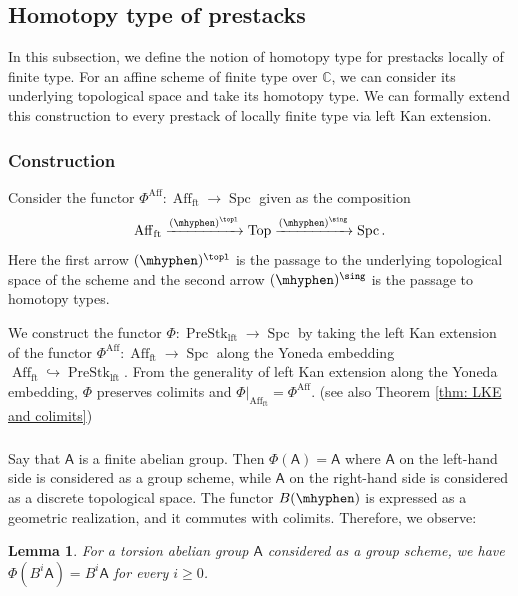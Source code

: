 \documentclass[10pt]{amsart}
\newcommand{\sssec}{\subsubsection}
\newtheorem{lemma}[subsubsection]{Lemma}
\theoremstyle{remark}
\newcommand{\C}{\mathbb{C}}
\newcommand{\on}{\operatorname}
\newcommand{\PreStklft}{\on{PreStk}_{\on{lft}}}
\newcommand{\Aff}{\on{Aff}}
\newcommand{\Affft}{\on{Aff}_{\on{ft}}}
\newcommand{\Spc}{\on{Spc}}
\newcommand{\sfA}{\mathsf{A}}
\begin{document}
\subsection{Homotopy type of prestacks}
In this subsection, we define the notion of homotopy type for prestacks locally of finite type. For an affine scheme of finite type over $\C$, we can consider its underlying topological space and take its homotopy type. We can formally extend this construction to every prestack of locally finite type via left Kan extension.

\sssec{Construction}
Consider the functor $\Phi^{\on{Aff}}: \Affft\rightarrow \Spc$ given as the composition \[\Affft \xrightarrow{(\mhyphen)^{\topl}} \on{Top} \xrightarrow{(\mhyphen)^{\sing}} \Spc.\] Here the first arrow $(\mhyphen)^{\topl}$ is the passage to the underlying topological space of the scheme and the second arrow $(\mhyphen)^{\sing}$ is the passage to homotopy types.
\medskip

We construct the functor $\Phi: \PreStklft \rightarrow \Spc$ by taking the left Kan extension of the functor $\Phi^{\on{Aff}}: \Affft\rightarrow \Spc$ along the Yoneda embedding $\Affft\hookrightarrow\PreStklft$. From the generality of left Kan extension along the Yoneda embedding, $\Phi$ preserves colimits and $\Phi|_{\Affft}=\Phi^{\Aff}$. (see also Theorem \ref{thm: LKE and colimits})

\sssec{}
Say that $\sfA$ is a finite abelian group. Then $\Phi(\sfA)=\sfA$ where $\sfA$ on the left-hand side is considered as a group scheme, while $\sfA$ on the right-hand side is considered as a discrete topological space. The functor $B(\mhyphen)$ is expressed as a geometric realization, and it commutes with colimits. Therefore, we observe: 

\begin{lemma}\label{lem: Phi for BiA}
    For a torsion abelian group $\sfA$ considered as a group scheme, we have
    $\Phi(B^i \sfA)= B^i \sfA$ for every $i\ge 0$.
\end{lemma}
\end{document}

